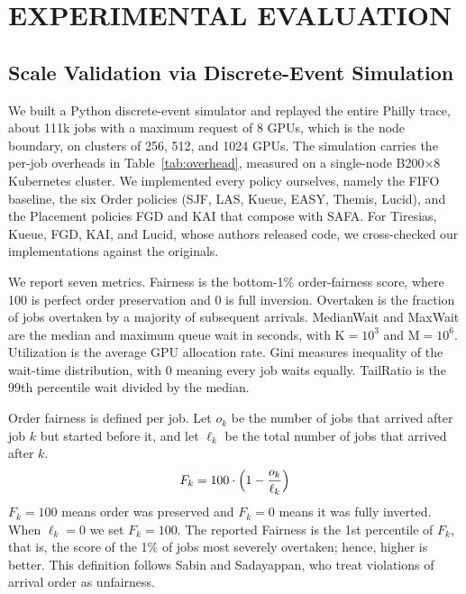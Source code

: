 \documentclass{ieeetj}
\begin{document}
\section{EXPERIMENTAL EVALUATION}\label{sec:eval}

\subsection{Scale Validation via Discrete-Event Simulation}\label{eval:sim}
We built a Python discrete-event simulator and replayed the entire Philly trace\cite{jeon2019philly}, about 111k jobs with a maximum request of 8 GPUs, which is the node boundary, on clusters of 256, 512, and 1024 GPUs. The simulation carries the per-job overheads in Table~\ref{tab:overhead}, measured on a single-node B200$\times$8 Kubernetes cluster. We implemented every policy ourselves, namely the FIFO baseline, the six Order policies (SJF, LAS, Kueue, EASY, Themis, Lucid), and the Placement policies FGD and KAI that compose with SAFA. For Tiresias, Kueue, FGD, KAI, and Lucid, whose authors released code, we cross-checked our implementations against the originals.

\begin{table}[htb!]
\centering
\caption{Per-job lifecycle overhead}
\label{tab:overhead}
\small
{}
\end{table}

\noindent We report seven metrics. Fairness is the bottom-1\% order-fairness score, where 100 is perfect order preservation and 0 is full inversion. Overtaken is the fraction of jobs overtaken by a majority of subsequent arrivals. MedianWait and MaxWait are the median and maximum queue wait in seconds, with K$=10^3$ and M$=10^6$. Utilization is the average GPU allocation rate. Gini measures inequality of the wait-time distribution, with 0 meaning every job waits equally. TailRatio is the 99th percentile wait divided by the median.

Order fairness is defined per job. Let $o_k$ be the number of jobs that arrived after job $k$ but started before it, and let $\ell_k$ be the total number of jobs that arrived after $k$.
\begin{equation}
F_k = 100\cdot\Bigl(1 - \frac{o_k}{\ell_k}\Bigr)
\label{eq:order-fair}
\end{equation}
$F_k=100$ means order was preserved and $F_k=0$ means it was fully inverted. When $\ell_k=0$ we set $F_k=100$. The reported Fairness is the 1st percentile of $F_k$, that is, the score of the 1\% of jobs most severely overtaken; hence, higher is better. This definition follows Sabin and Sadayappan\cite{sabin2005unfairness}, who treat violations of arrival order as unfairness.
\end{document}
